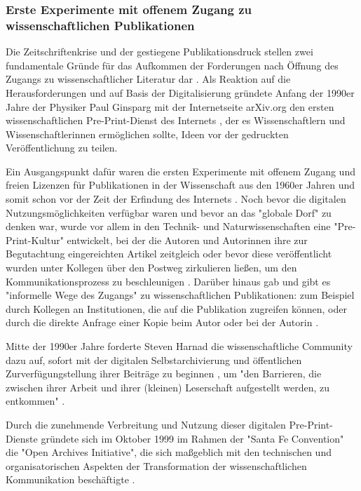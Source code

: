 \subsubsection{Erste Experimente mit offenem Zugang zu wissenschaftlichen Publikationen}

Die Zeitschriftenkrise und der gestiegene Publikationsdruck stellen zwei fundamentale Gründe für das Aufkommen der Forderungen nach Öffnung des Zugangs zu wissenschaftlicher Literatur dar \cite{Brintzinger_2010} \cite{wein_2010_erwerbung}. Als Reaktion auf die Herausforderungen und auf Basis der Digitalisierung gründete Anfang der 1990er Jahre der Physiker Paul Ginsparg mit der Internetseite arXiv.org den ersten wissenschaftlichen Pre-Print-Dienst des Internets \cite{cite:5} \cite{bjork_2004_open}, der es Wissenschaftlern und Wissenschaftlerinnen ermöglichen sollte, Ideen vor der gedruckten Veröffentlichung zu teilen.

Ein Ausgangspunkt dafür waren die ersten Experimente mit offenem Zugang und freien Lizenzen für Publikationen in der Wissenschaft aus den 1960er Jahren und somit schon vor der Zeit der Erfindung des Internets \cite{cite:18b}. Noch bevor die digitalen Nutzungsmöglichkeiten verfügbar waren und bevor an das "globale Dorf" \cite{mcluhan_1962_gutenberg} zu denken war, wurde vor allem in den Technik- und Naturwissenschaften eine "Pre-Print-Kultur" entwickelt, bei der die Autoren und Autorinnen ihre zur Begutachtung eingereichten Artikel zeitgleich oder bevor diese veröffentlicht wurden unter Kollegen über den Postweg zirkulieren ließen, um den Kommunikationsprozess zu beschleunigen \cite{suchen-Hoffmann-Zugang-undVerwertung-oeffentlicher-Informationen}. Darüber hinaus gab und gibt es "informelle Wege des Zugangs" zu wissenschaftlichen Publikationen: zum Beispiel durch Kollegen an Institutionen, die auf die Publikation zugreifen können, oder durch die direkte Anfrage einer Kopie beim Autor oder bei der Autorin \cite{davis_2011_open}.

Mitte der 1990er Jahre forderte Steven Harnad die wissenschaftliche Community dazu auf, sofort mit der digitalen Selbstarchivierung und öffentlichen Zurverfügungstellung ihrer Beiträge zu beginnen \cite{albert_2006_open_implications}, um "den Barrieren, die zwischen ihrer Arbeit und ihrer (kleinen) Leserschaft aufgestellt werden, zu entkommen" \cite{harnad_1995_subversive_proposal}.

Durch die zunehmende Verbreitung und Nutzung dieser digitalen Pre-Print-Dienste gründete sich im Oktober 1999 im Rahmen der "Santa Fe Convention" die "Open Archives Initiative", die sich maßgeblich mit den technischen und organisatorischen Aspekten der Transformation der wissenschaftlichen Kommunikation beschäftigte \cite{van_2000_santa_fe}.

